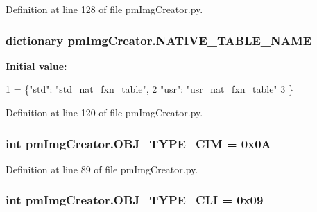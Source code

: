 Definition at line 128 of file pm\-Img\-Creator.\-py.

\hypertarget{namespacepm_img_creator_aebf3122482880e2d48a545e6d55e38c5}{
\subsubsection[{N\-A\-T\-I\-V\-E\-\_\-\-T\-A\-B\-L\-E\-\_\-\-N\-A\-M\-E}]{\setlength{\rightskip}{0pt plus 5cm}dictionary pm\-Img\-Creator.\-N\-A\-T\-I\-V\-E\-\_\-\-T\-A\-B\-L\-E\-\_\-\-N\-A\-M\-E}}\label{namespacepm_img_creator_aebf3122482880e2d48a545e6d55e38c5}
{\bfseries Initial value\-:}
\begin{DoxyCode}
1 = \{\textcolor{stringliteral}{"std"}: \textcolor{stringliteral}{"std\_nat\_fxn\_table"},
2                      \textcolor{stringliteral}{"usr"}: \textcolor{stringliteral}{"usr\_nat\_fxn\_table"}
3                     \}
\end{DoxyCode}


Definition at line 120 of file pm\-Img\-Creator.\-py.

\hypertarget{namespacepm_img_creator_ad007a59b331893030a7be310c4e346f6}{
\subsubsection[{O\-B\-J\-\_\-\-T\-Y\-P\-E\-\_\-\-C\-I\-M}]{\setlength{\rightskip}{0pt plus 5cm}int pm\-Img\-Creator.\-O\-B\-J\-\_\-\-T\-Y\-P\-E\-\_\-\-C\-I\-M = 0x0\-A}}\label{namespacepm_img_creator_ad007a59b331893030a7be310c4e346f6}


Definition at line 89 of file pm\-Img\-Creator.\-py.

\hypertarget{namespacepm_img_creator_ae64d6814dd206b385ad128e27db02ed7}{
\subsubsection[{O\-B\-J\-\_\-\-T\-Y\-P\-E\-\_\-\-C\-L\-I}]{\setlength{\rightskip}{0pt plus 5cm}int pm\-Img\-Creator.\-O\-B\-J\-\_\-\-T\-Y\-P\-E\-\_\-\-C\-L\-I = 0x09}}\label{namespacepm_img_creator_ae64d6814dd206b385ad128e27db02ed7}


